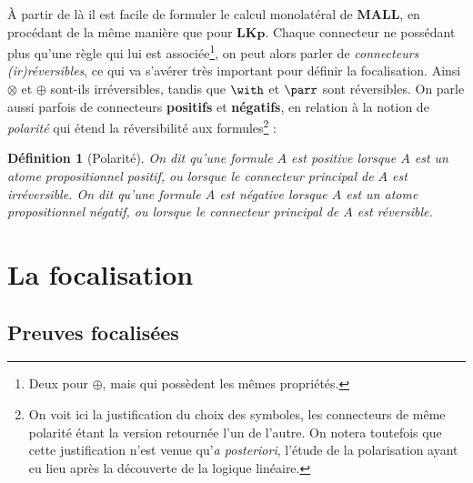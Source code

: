 \documentclass[11pt]{report}
\newtheorem{definition}{Définition}
\begin{document}
À partir de là il est facile de formuler le calcul monolatéral de $\mathbf{MALL}$, en procédant de la même manière que pour $\mathbf{LKp}$. Chaque connecteur ne possédant plus qu'une règle qui lui est associée\footnote{Deux pour $\oplus$, mais qui possèdent les mêmes propriétés.}, on peut alors parler de \emph{connecteurs (ir)réversibles}, ce qui va s'avérer très important pour définir la focalisation. Ainsi $\otimes$ et $\oplus$ sont-ils irréversibles, tandis que $\with$ et $\parr$ sont réversibles. On parle aussi parfois de connecteurs \textbf{positifs} et \textbf{négatifs}, en relation à la notion de \emph{polarité} qui étend la réversibilité aux formules\footnote{On voit ici la justification du choix des symboles, les connecteurs de même polarité étant la version retournée l'un de l'autre. On notera toutefois que cette justification n'est venue qu'\textit{a posteriori}, l'étude de la polarisation ayant eu lieu après la découverte de la logique linéaire.} :

\begin{definition}[Polarité]
	On dit qu'une formule $A$ est \emph{positive} lorsque $A$ est un atome propositionnel positif, ou lorsque le connecteur principal de $A$ est irréversible.
	On dit qu'une formule $A$ est \emph{négative} lorsque $A$ est un atome propositionnel négatif, ou lorsque le connecteur principal de $A$ est réversible.
\end{definition}

\chapter{La focalisation}

\section{Preuves focalisées}
\end{document}
